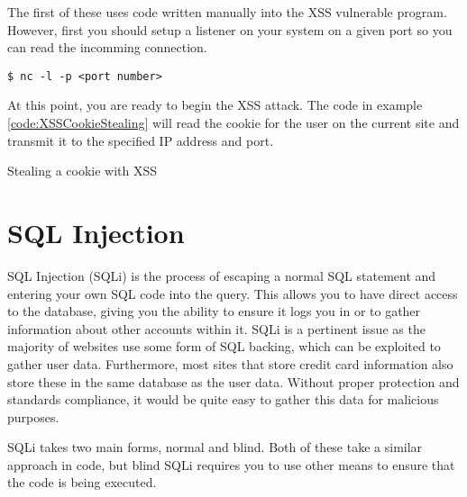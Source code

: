 				The first of these uses code written manually into the XSS vulnerable program.
				However, first you should setup a listener on your system on a given port so you can read the incomming connection.
				\begin{lstlisting}[style=CLI]
					$ nc -l -p <port number>
				\end{lstlisting}

				At this point, you are ready to begin the XSS attack.
				The code in example \ref{code:XSSCookieStealing} will read the cookie for the user on the current site and transmit it to the specified IP address and port.
				\begin{code}
					\centering
					\label{code:XSSCookieStealing}
					\caption{Stealing a cookie with XSS}
				\end{code}

	\section{SQL Injection}
		SQL Injection (SQLi) is the process of escaping a normal SQL statement and entering your own SQL code into the query.
		This allows you to have direct access to the database, giving you the ability to ensure it logs you in or to gather information about other accounts within it.
		SQLi is a pertinent issue as the majority of websites use some form of SQL backing, which can be exploited to gather user data.
		Furthermore, most sites that store credit card information also store these in the same database as the user data.
		Without proper protection and standards compliance, it would be quite easy to gather this data for malicious purposes.

		SQLi takes two main forms, normal and blind.
		Both of these take a similar approach in code, but blind SQLi requires you to use other means to ensure that the code is being executed.
